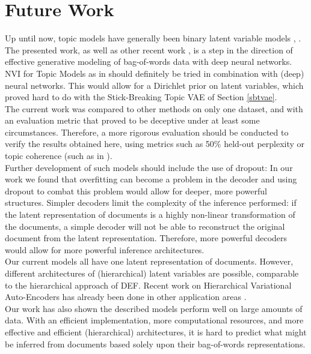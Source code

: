 \documentclass{report}
\begin{document}
\section{Future Work}
Up until now, topic models have generally been binary latent variable models \cite{blei2003latent}, \cite{ranganath2015deep}. The presented work, as well as other recent work \cite{srivastava2017neural}, is a step in the direction of effective generative modeling of bag-of-words data with deep neural networks. NVI for Topic Models as in \cite{srivastava2017neural} should definitely be tried in combination with (deep) neural networks. This would allow for a Dirichlet prior on latent variables, which proved hard to do with the Stick-Breaking Topic VAE of Section \ref{sbtvae}. \\The current work was compared to other methods on only one dataset, and with an evaluation metric that proved to be deceptive under at least some circumstances. Therefore, a more rigorous evaluation should be conducted to verify the results obtained here, using metrics such as 50\% held-out perplexity or topic coherence (such as in \cite{srivastava2017neural}). \\
Further development of such models should include the use of dropout: In our work we found that overfitting can become a problem in the decoder and using dropout to combat this problem would allow for deeper, more powerful structures. Simpler decoders limit the complexity of the inference performed: if the latent representation of documents is a highly non-linear transformation of the documents, a simple decoder will not be able to reconstruct the original document from the latent representation. Therefore, more powerful decoders would allow for more powerful inference architectures. \\
Our current models all have one latent representation of documents. However, different architectures of  (hierarchical) latent variables are possible, comparable to the hierarchical approach of DEF. Recent work on Hierarchical Variational Auto-Encoders has already been done in other application areas  \cite{sonderby2016ladder} \cite{bachman2016architecture} \cite{zhao2017learning}. \\
Our work has also shown the described models perform well on large amounts of data. With an efficient implementation, more computational resources, and more effective and efficient (hierarchical) architectures, it is hard to predict what might be inferred from documents based solely upon their bag-of-words representations. 

\end{document}
